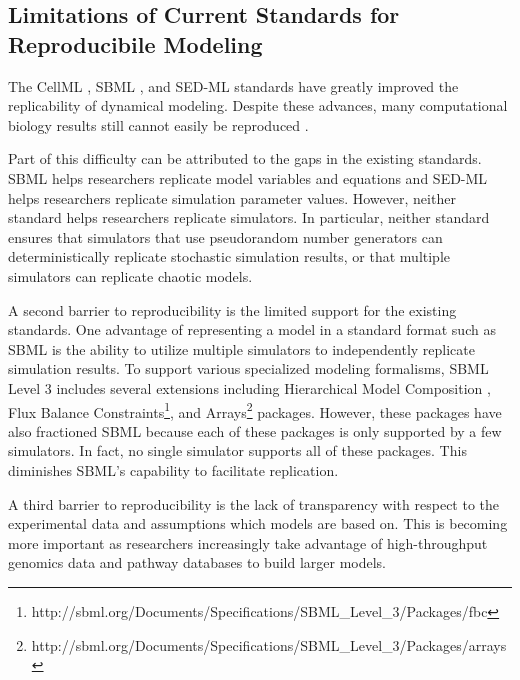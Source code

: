 \documentclass[journal,transmag,twoside]{IEEEtran}
\begin{document}

\subsection{Limitations of Current Standards for Reproducibile Modeling}

The CellML \cite{cuellar2003overview}, SBML \cite{hucka2003}, and SED-ML \cite{sedml2011} standards have greatly improved the replicability of dynamical modeling.
Despite these advances, many computational biology results still cannot easily be reproduced \cite{garijo2013quantifying}.

Part of this difficulty can be attributed to the gaps in the existing standards.
SBML helps researchers replicate model variables and equations and SED-ML helps researchers replicate simulation parameter values. 
However, neither standard helps researchers replicate simulators. 
In particular, neither standard ensures that simulators that use pseudorandom number generators can deterministically replicate stochastic simulation results, 
or that multiple simulators can replicate chaotic models.

A second barrier to reproducibility is the limited support for the existing standards.
One advantage of representing a model in a standard format such as SBML is the ability
to utilize multiple simulators to independently replicate simulation results. To support various specialized
modeling formalisms, SBML Level 3 includes several extensions including
Hierarchical Model Composition \cite{smith2015sbml},
Flux Balance Constraints\footnote{http://sbml.org/Documents/Specifications/SBML\_Level\_3/Packages/fbc}, and
Arrays\footnote{http://sbml.org/Documents/Specifications/SBML\_Level\_3/Packages/arrays} packages.
However, these packages have also fractioned SBML because each of these packages is only supported by a few simulators. 
In fact, no single simulator supports all of these packages.
This diminishes SBML's capability to facilitate replication.

A third barrier to reproducibility is the lack of transparency with respect to the experimental data and assumptions which models are based on.
This is becoming more important as researchers increasingly take advantage of high-throughput genomics data and pathway databases to build larger models.
\end{document}
